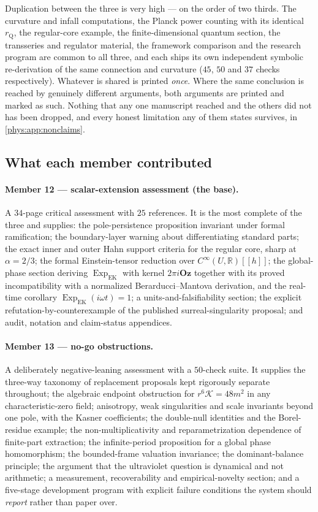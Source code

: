 \documentclass[11pt,letterpaper]{article}
\numberwithin{equation}{section}
\theoremstyle{definition}
\theoremstyle{remark}
\newcommand{\R}{\mathbb R}
\newcommand{\Kret}{\mathcal K}
\newcommand{\Oz}{\mathbf{Oz}}
\newcommand{\ExpEK}{\operatorname{Exp}_{\mathrm{EK}}}
\begin{document}
Duplication between the three is very high --- on the order of two thirds. The
curvature and infall computations, the Planck power counting with its identical
$r_{\mathrm Q}$, the regular-core example, the finite-dimensional quantum
section, the transseries and regulator material, the framework comparison and
the research program are common to all three, and each ships its own
independent symbolic re-derivation of the same connection and curvature
($45$, $50$ and $37$ checks respectively). Whatever is shared is printed
\emph{once}. Where the same conclusion is reached by genuinely different
arguments, both arguments are printed and marked as such. Nothing that any one
manuscript reached and the others did not has been dropped, and every honest
limitation any of them states survives, in \cref{phys:app:nonclaims}.

\subsection{What each member contributed}
\label{phys:sub:contrib}

\paragraph{Member 12 --- scalar-extension assessment (the base).}
A $34$-page critical assessment with $25$ references. It is the most complete
of the three and supplies: the pole-persistence proposition invariant under
formal ramification; the boundary-layer warning about differentiating standard
parts; the exact inner and outer Hahn support criteria for the regular core,
sharp at $\alpha=2/3$; the formal Einstein-tensor reduction over
$C^{\infty}(U,\R)[[h]]$; the global-phase section deriving $\ExpEK$ with kernel
$2\pi i\Oz$ together with its proved incompatibility with a normalized
Berarducci--Mantova derivation, and the real-time corollary
$\ExpEK(i\omega t)=1$; a units-and-falsifiability section; the explicit
refutation-by-counterexample of the published surreal-singularity proposal; and
audit, notation and claim-status appendices.

\paragraph{Member 13 --- no-go obstructions.}
A deliberately negative-leaning assessment with a $50$-check suite. It supplies
the three-way taxonomy of replacement proposals kept rigorously separate
throughout; the algebraic endpoint obstruction for $r^{6}\Kret=48m^{2}$ in any
characteristic-zero field; anisotropy, weak singularities and scale invariants
beyond one pole, with the Kasner coefficients; the double-null identities and
the Borel-residue example; the non-multiplicativity and reparametrization
dependence of finite-part extraction; the infinite-period proposition for a
global phase homomorphism; the bounded-frame valuation invariance; the
dominant-balance principle; the argument that the ultraviolet question is
dynamical and not arithmetic; a measurement, recoverability and
empirical-novelty section; and a five-stage development program with explicit
failure conditions the system should \emph{report} rather than paper over.
\end{document}
